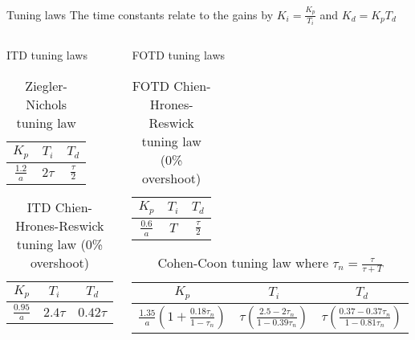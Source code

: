 \documentclass[9pt]{beamer-control}
\begin{document}
\begin{frame}{Tuning laws}
	\centering
	The time constants relate to the gains by $K_i= \frac{K_p}{T_i}$ and $K_d = K_p T_d$\\
	\vfill
	
	\begin{columns}
		\begin{column}{0.4\textwidth}
			ITD tuning laws
			\begin{table}
				\centering
				\begin{tabular}{|c|c|c|}
					\hline
					$K_p$ & $T_i$ & $T_d$\\
					\hline
					$\frac{1.2}{a}$ & $2\tau$ & $\frac{\tau}{2}$\\
					\hline	
				\end{tabular}
				\caption{Ziegler-Nichols tuning law}
			\end{table}
			
			\begin{table}
				\centering
				\begin{tabular}{|c|c|c|}
					\hline
					$K_p$ & $T_i$ & $T_d$\\
					\hline
					$\frac{0.95}{a}$ & $2.4 \tau$ & $0.42 \tau$\\
					\hline	
				\end{tabular}
				\caption{ITD Chien-Hrones-Reswick tuning law (0\% overshoot)}
			\end{table}
		\end{column}
		\begin{column}{0.6\textwidth} 
			
			FOTD tuning laws
			\begin{table}
				\centering
				\begin{tabular}{|c|c|c|}
					\hline
					$K_p$ & $T_i$ & $T_d$\\
					\hline
					$\frac{0.6}{a}$ & $T$ & $\frac{\tau}{2}$\\
					\hline	
				\end{tabular}
				\caption{FOTD Chien-Hrones-Reswick tuning law (0\% overshoot)}
			\end{table}
			
			\begin{table}
				\centering
				\begin{tabular}{|c|c|c|}
					\hline
					$K_p$ & $T_i$ & $T_d$\\
					\hline
		\tiny{$\frac{1.35}{a}\left(1 + \frac{0.18 \tau_n}{1-\tau_n} \right)$} & \tiny{$ \tau\left( \frac{2.5-2\tau_n}{1-0.39\tau_n} \right) $} & \tiny{$\tau \left( \frac{0.37-0.37\tau_n}{1-0.81\tau_n} \right)$}\\
					\hline	
				\end{tabular}
				\caption{Cohen-Coon tuning law where $\tau_n=\frac{\tau}{\tau+T}$}
			\end{table}
		\end{column}
	\end{columns}
	
	
\end{frame}
\end{document}
